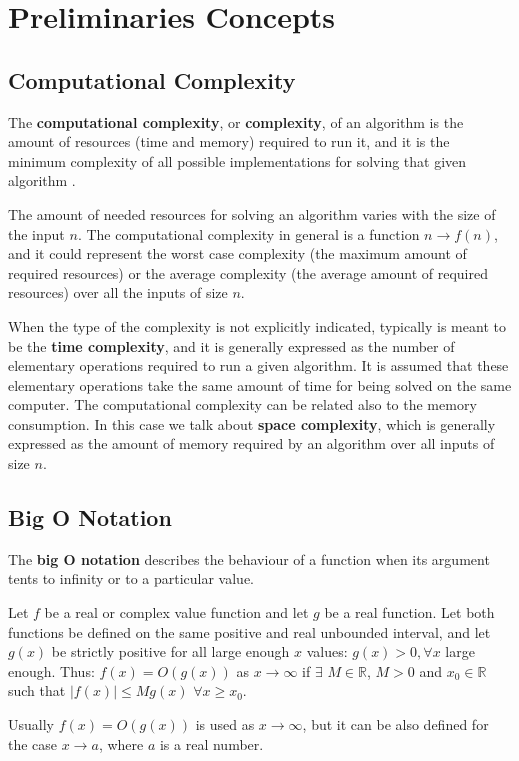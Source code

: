 \chapter{Preliminaries Concepts}
\label{preliminariesconcepts}

\section{Computational Complexity}
The \textbf{computational complexity}, or \textbf{complexity}, of an algorithm is the amount of resources (time and memory) required to run it, and it is the minimum complexity of all possible implementations for solving that given algorithm \cite{wikipediacomplexity}.

The amount of needed resources for solving an algorithm varies with the size of the input \(n\). The computational complexity in general is a function \(n \rightarrow f(n)\), and it could represent the worst case complexity (the maximum amount of required resources) or the average complexity (the average amount of required resources) over all the inputs of size \(n\).

When the type of the complexity is not explicitly indicated, typically is meant to be the \textbf{time complexity}, and it is generally expressed as the number of elementary operations required to run a given algorithm. It is assumed that these elementary operations take the same amount of time for being solved on the same computer. The computational complexity can be related also to the memory consumption. In this case we talk about \textbf{space complexity}, which is generally expressed as the amount of memory required by an algorithm over all inputs of size \(n\).

\section{Big O Notation}
The \textbf{big O notation} \cite{wikipediabigo} describes the behaviour of a function when its argument tents to infinity or to a particular value.

\begin{definition}
Let \(f\) be a real or complex value function and let \(g\) be a real function. Let both functions be defined on the same positive and real unbounded interval, and let \(g(x)\) be strictly positive for all large enough \(x\) values: \(g(x) > 0, \forall x\) large enough. Thus: \(f(x)=O(g(x)) \) as \(x \rightarrow \infty \) if \(\exists\) \(M \in \mathbb{R} \), \(M>0\) and \(x_{0} \in \mathbb{R} \) such that \(|f(x)| \leq Mg(x)\) \(\forall x \geq x_{0}\). 
\end{definition}
Usually \(f(x)=O(g(x))\) is used as \(x \rightarrow \infty\), but it can be also defined for the case \(x \rightarrow a\), where \(a\) is a real number.

